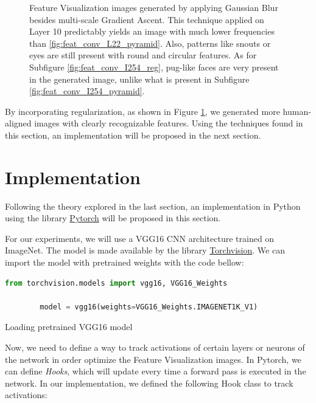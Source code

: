 \begin{figure}
    \caption{
        Feature Visualization images generated by applying Gaussian Blur besides multi-scale Gradient Ascent. 
        This technique applied on Layer 10 predictably yields an image with much lower frequencies than \ref{fig:feat_conv_L22_pyramid}. 
        Also, patterns like snouts or eyes are still present with round and circular features. 
        As for Subfigure \ref{fig:feat_conv_I254_reg}, pug-like faces are very present in the generated image, unlike what is present in Subfigure \ref{fig:feat_conv_I254_pyramid}.   
    }
    \label{fig:feat_vis_regularization}

\end{figure}

\newpage

By incorporating regularization, as shown in Figure \ref{fig:feat_vis_regularization}, we generated more human-aligned images with clearly recognizable features.
Using the techniques found in this section, an implementation will be proposed in the next section.

\section{Implementation}

Following the theory explored in the last section, an implementation in Python using the library \href{https://pytorch.org/}{Pytorch} will be proposed in this section. 

For our experiments, we will use a VGG16 CNN architecture trained on ImageNet. The model is made available by the library \href{https://pytorch.org/vision/stable/index.html}{Torchvision}. 
We can import the model with pretrained weights with the code bellow: 

\begin{program}
    \centering

    \begin{lstlisting}[language=Python, style=wider]
        from torchvision.models import vgg16, VGG16_Weights

        model = vgg16(weights=VGG16_Weights.IMAGENET1K_V1)
    \end{lstlisting}

    \caption{Loading pretrained VGG16 model}
\end{program}

Now, we need to define a way to track activations of certain layers or neurons of the network in order optimize the Feature Visualization images. 
In Pytorch, we can define \emph{Hooks}, which will update every time a forward pass is executed in the network. 
In our implementation, we defined the following Hook class to track activations:

